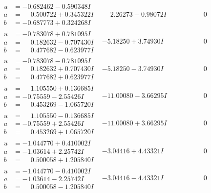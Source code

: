 \documentclass[1p]{elsarticle_modified}
\theoremstyle{definition}
\begin{document}
$$\begin{array}{c|c|c}
\begin{aligned}
u &= -0.682462 - 0.590348 I \\
a &= \phantom{-}0.500722 + 0.345322 I \\
b &= -0.687773 + 0.324268 I\end{aligned}
 & \phantom{-}2.26273 - 0.98072 I & \phantom{-0.000000 } 0 \\ \hline\begin{aligned}
u &= -0.783078 + 0.781095 I \\
a &= \phantom{-}0.182632 - 0.707430 I \\
b &= \phantom{-}0.477682 - 0.623977 I\end{aligned}
 & -5.18250 + 3.74930 I & \phantom{-0.000000 } 0 \\ \hline\begin{aligned}
u &= -0.783078 - 0.781095 I \\
a &= \phantom{-}0.182632 + 0.707430 I \\
b &= \phantom{-}0.477682 + 0.623977 I\end{aligned}
 & -5.18250 - 3.74930 I & \phantom{-0.000000 } 0 \\ \hline\begin{aligned}
u &= \phantom{-}1.105550 + 0.136685 I \\
a &= -0.75559 - 2.55426 I \\
b &= \phantom{-}0.453269 - 1.065720 I\end{aligned}
 & -11.00080 - 3.66295 I & \phantom{-0.000000 } 0 \\ \hline\begin{aligned}
u &= \phantom{-}1.105550 - 0.136685 I \\
a &= -0.75559 + 2.55426 I \\
b &= \phantom{-}0.453269 + 1.065720 I\end{aligned}
 & -11.00080 + 3.66295 I & \phantom{-0.000000 } 0 \\ \hline\begin{aligned}
u &= -1.044770 + 0.410002 I \\
a &= -1.03614 + 2.25742 I \\
b &= \phantom{-}0.500058 + 1.205840 I\end{aligned}
 & -3.04416 + 4.43321 I & \phantom{-0.000000 } 0 \\ \hline\begin{aligned}
u &= -1.044770 - 0.410002 I \\
a &= -1.03614 - 2.25742 I \\
b &= \phantom{-}0.500058 - 1.205840 I\end{aligned}
 & -3.04416 - 4.43321 I & \phantom{-0.000000 } 0 \\ \hline\begin{aligned}

\end{aligned}
\end{array}$$
\end{document}
